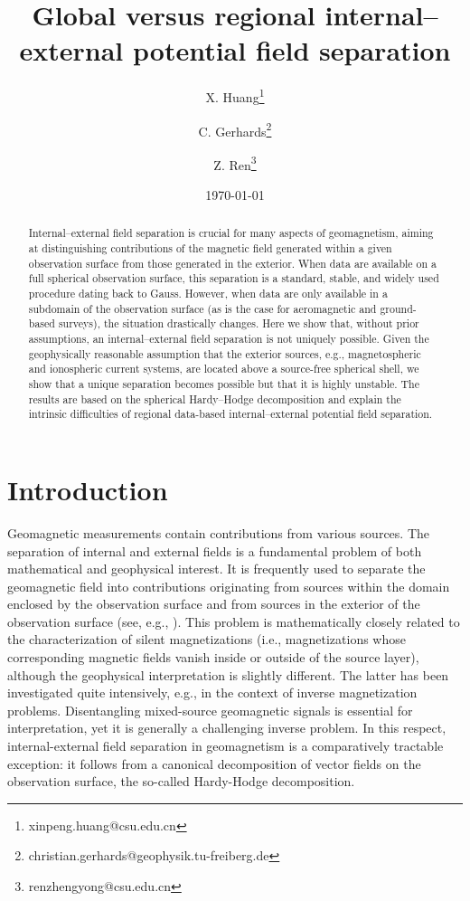 \documentclass[a4paper, 11pt]{article}
\title{Global versus regional internal–external potential field separation
}
\author[1]{X. Huang\thanks{xinpeng.huang@csu.edu.cn}}
\author[2]{C. Gerhards\thanks{christian.gerhards@geophysik.tu-freiberg.de}}
\author[1]{Z. Ren\thanks{renzhengyong@csu.edu.cn}}%
\affil[1]{Central South University, School of Geosciences and Info-Physics, China}
\affil[2]{TU Bergakademie Freiberg, Institute of Geophysics and Geoinformatics, Germany}
\date{\today}
\begin{document}
	
\maketitle
	
\begin{abstract}

Internal–external field separation is crucial for many aspects of geomagnetism, aiming at distinguishing contributions of the magnetic field generated within a given observation surface from those generated in the exterior. When data are available on a full spherical observation surface, this separation is a standard, stable, and widely used procedure dating back to Gauss. However, when data are only available in a subdomain of the observation surface (as is the case for aeromagnetic and ground-based surveys), the situation drastically changes. Here we show that, without prior assumptions, an internal–external field separation is not uniquely possible. Given the geophysically reasonable assumption that the exterior sources, e.g., magnetospheric and ionospheric current systems, are located above a source-free spherical shell, we show that a unique separation becomes possible but that it is highly unstable. The results are based on the spherical Hardy--Hodge decomposition and explain the intrinsic difficulties of regional data-based internal--external potential field separation. 
\end{abstract}

	
\section{Introduction}


Geomagnetic measurements contain contributions from various sources. The separation of internal and external fields is a fundamental problem of both mathematical and geophysical interest. It is frequently used to separate the geomagnetic field into contributions originating from sources within the domain enclosed by the observation surface and from sources in the exterior of the observation surface (see, e.g., \cite{backus1996,baratchartgerhards16,Mayer2006,olsen10b,Plattner2017,sabaka15}). This problem is mathematically closely related to the characterization of silent magnetizations (i.e., magnetizations whose corresponding magnetic fields vanish inside or outside of the source layer), although the geophysical interpretation is slightly different. The latter has been investigated quite intensively, e.g., \cite{BGK,baratchart13,barvilhar19,gerhards16a,gubbins11,verles19,verles18} in the context of inverse magnetization problems. Disentangling mixed-source geomagnetic signals is essential for interpretation, yet it is generally a challenging inverse problem. In this respect, internal-external field separation in geomagnetism is a comparatively tractable exception: it follows from a canonical decomposition of vector fields on the observation surface, the so-called Hardy-Hodge decomposition.
\end{document}
